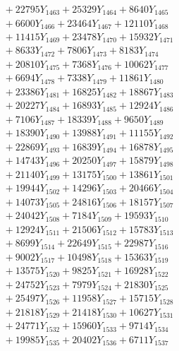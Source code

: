 \documentclass[a4paper,10pt]{article}
\begin{document}
{\begin{align}
&\;  + 22795 Y_{1463} + 25329 Y_{1464} + 8640 Y_{1465} \\[0.3ex]
&\;  + 6600 Y_{1466} + 23464 Y_{1467} + 12110 Y_{1468} \\[0.5ex]\allowbreak
&\;  + 11415 Y_{1469} + 23478 Y_{1470} + 15932 Y_{1471} \\[0.3ex]
&\;  + 8633 Y_{1472} + 7806 Y_{1473} + 8183 Y_{1474} \\[0.3ex]
&\;  + 20810 Y_{1475} + 7368 Y_{1476} + 10062 Y_{1477} \\[0.3ex]
&\;  + 6694 Y_{1478} + 7338 Y_{1479} + 11861 Y_{1480} \\[0.3ex]
&\;  + 23386 Y_{1481} + 16825 Y_{1482} + 18867 Y_{1483} \\[0.3ex]
&\;  + 20227 Y_{1484} + 16893 Y_{1485} + 12924 Y_{1486} \\[0.3ex]
&\;  + 7106 Y_{1487} + 18339 Y_{1488} + 9650 Y_{1489} \\[0.3ex]
&\;  + 18390 Y_{1490} + 13988 Y_{1491} + 11155 Y_{1492} \\[0.3ex]
&\;  + 22869 Y_{1493} + 16839 Y_{1494} + 16878 Y_{1495} \\[0.3ex]
&\;  + 14743 Y_{1496} + 20250 Y_{1497} + 15879 Y_{1498} \\[0.5ex]\allowbreak
&\;  + 21140 Y_{1499} + 13175 Y_{1500} + 13861 Y_{1501} \\[0.3ex]
&\;  + 19944 Y_{1502} + 14296 Y_{1503} + 20466 Y_{1504} \\[0.3ex]
&\;  + 14073 Y_{1505} + 24816 Y_{1506} + 18157 Y_{1507} \\[0.3ex]
&\;  + 24042 Y_{1508} + 7184 Y_{1509} + 19593 Y_{1510} \\[0.3ex]
&\;  + 12924 Y_{1511} + 21506 Y_{1512} + 15783 Y_{1513} \\[0.3ex]
&\;  + 8699 Y_{1514} + 22649 Y_{1515} + 22987 Y_{1516} \\[0.3ex]
&\;  + 9002 Y_{1517} + 10498 Y_{1518} + 15363 Y_{1519} \\[0.3ex]
&\;  + 13575 Y_{1520} + 9825 Y_{1521} + 16928 Y_{1522} \\[0.3ex]
&\;  + 24752 Y_{1523} + 7979 Y_{1524} + 21830 Y_{1525} \\[0.3ex]
&\;  + 25497 Y_{1526} + 11958 Y_{1527} + 15715 Y_{1528} \\[0.5ex]\allowbreak
&\;  + 21818 Y_{1529} + 21418 Y_{1530} + 10627 Y_{1531} \\[0.3ex]
&\;  + 24771 Y_{1532} + 15960 Y_{1533} + 9714 Y_{1534} \\[0.3ex]
&\;  + 19985 Y_{1535} + 20402 Y_{1536} + 6711 Y_{1537} \\[0.3ex]

\end{align}}
\end{document}
